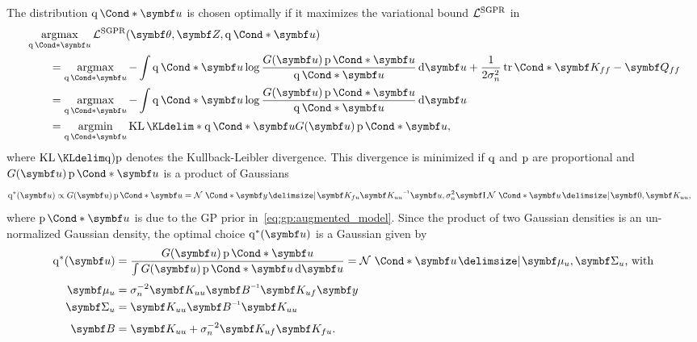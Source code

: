 The distribution $\Variat*{\mat{u}}$ is chosen optimally if it maximizes the variational bound $\mathcal{L}^{\text{SGPR}}$ in
\begin{equation}
    \begin{split}
        \MoveEqLeft\argmax_{\Variat*{\mat{u}}}\Lc^{\text{SGPR}}(\mat{\theta}, \mat{Z}, \Variat*{\mat{u}})                                                                                             \\
        & = \argmax_{\Variat*{\mat{u}}} -\int \Variat*{\mat{u}} \log\frac{G(\mat{u})\Prob*{\mat{u}}}{\Variat*{\mat{u}}} \diff \mat{u} + \frac{1}{2\sigma_n^2}\Fun*{\tr}{\mat{K_{ff}} - \mat{Q_{ff}}} \\
        & = \argmax_{\Variat*{\mat{u}}} -\int \Variat*{\mat{u}} \log\frac{G(\mat{u})\Prob*{\mat{u}}}{\Variat*{\mat{u}}} \diff \mat{u}                                                                \\
        & = \argmin_{\Variat*{\mat{u}}} \KL*{\Variat*{\mat{u}}}{G(\mat{u})\Prob*{\mat{u}}},
    \end{split}
\end{equation}
where $\KL{\q)}{\p}$ denotes the Kullback-Leibler divergence.
This divergence is minimized if $\operatorname{q}$ and $\operatorname{p}$ are proportional and $G(\mat{u})\Prob*{\mat{u}}$ is a product of Gaussians
\begin{align}
    \q^\ast(\mat{u}) \propto G(\mat{u}) \Prob*{\mat{u}}
     & = \Gaussian*{\mat{y} \given \mat{K_{fu}} \mat{K_{uu}}\inv \mat{u}, \sigma_n^2\Eye}\Gaussian*{\mat{u} \given \mat{0}, \mat{K_{uu}}},
\end{align}
where $\Prob*{\mat{u}}$ is due to the GP prior in~\cref{eq:gp:augmented_model}.
Since the product of two Gaussian densities is an un-normalized Gaussian density, the optimal choice $\q^\ast(\mat{u})$ is a Gaussian given by
\begin{equation}
    \begin{split}
        \label{eq:gp:sgpr_optimal_q}
        \q^\ast(\mat{u})
        & = \frac{G(\mat{u}) \Prob*{\mat{u}}}{\int G(\mat{u}) \Prob*{\mat{u}} \diff \mat{u}}
        = \Gaussian*{\mat{u} \given \mat{\mu}_u, \mat{\Sigma}_u}\text{, with}                 \\[\smallskipamount]
        \mat{\mu}_u
        & = \sigma_n^{-2} \mat{K_{uu}}\mat{B}\inv \mat{K_{uf}}\mat{y}                        \\
        \mat{\Sigma}_u
        & = \mat{K_{uu}}\mat{B}\inv\mat{K_{uu}}                                              \\[\smallskipamount]
        \mat{B}
        & = \mat{K_{uu}} + \sigma_n^{-2} \mat{K_{uf}}\mat{K_{fu}}.
    \end{split}
\end{equation}
